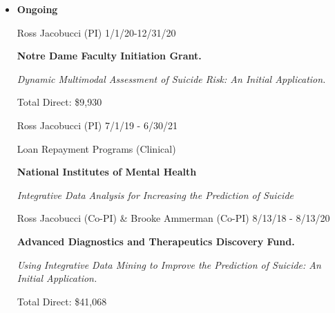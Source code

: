 \documentclass[letterpaper,10pt]{article}
\begin{document}
\begin{itemize} 
	\setlength{\topsep}{0pt}%
	\setlength{\leftmargin}{0.1in}%
	\setlength{\listparindent}{-0.1in}%
	\setlength{\itemindent}{-0.2in}%
	\setlength{\parsep}{\parskip}%
\begin{comment}		
	\item {\textbf{\large{Pending}}}


\begin{center}
	\parbox{6.5in}{{Ross Jacobucci (PI) }   \hspace{9cm} Under Review}
	\parbox{6.5in}{\textbf{IES Statistical and Research Methodology in Education: Early Career Grant} }
	\parbox{6.5in}{\textit{Extending Regularized Structural Equation Modeling for Big Data in Education Research}}
	\parbox{6.5in}{Total Direct: \$139,759}
\end{center}

\begin{center}
	\parbox{6.5in}{{Ross Jacobucci (Co-PI) \& Brooke Ammerman (Co-PI)}   \hspace{3.8cm} Under Review}
	\parbox{6.5in}{\textbf{NIH 1R03MH120488-01} }
	\parbox{6.5in}{\textit{The Implementation and Validation of Integrative Machine Learning for Predicting Suicide Outcomes}}
	\parbox{6.5in}{Total Direct: \$99,188}
\end{center}
\end{comment}	

	
	\item{\textbf{\large{Ongoing}}}
	
		\begin{center}
		\parbox{6.5in}{{Ross Jacobucci (PI)}   \hspace{9.2cm} 1/1/20-12/31/20}
		\parbox{6.5in}{\textbf{Notre Dame Faculty Initiation Grant.} }
		\parbox{6.5in}{\textit{Dynamic Multimodal Assessment of Suicide Risk: An Initial Application.}}
		\parbox{6.5in}{Total Direct: \$9,930}
	\end{center}
	
	\begin{center}
		\parbox{6.5in}{{Ross Jacobucci (PI) }   \hspace{9cm} 7/1/19 - 6/30/21}
		\parbox{6.5in}{Loan Repayment Programs (Clinical)}
		\parbox{6.5in}{\textbf{National Institutes of Mental Health} }
		\parbox{6.5in}{\textit{Integrative Data Analysis for Increasing the Prediction of Suicide}}
	\end{center}
	
	
	
	\begin{center}
		\parbox{6.5in}{{Ross Jacobucci (Co-PI) \& Brooke Ammerman (Co-PI)}   \hspace{3.8cm} 8/13/18 - 8/13/20}
		\parbox{6.5in}{\textbf{Advanced Diagnostics and Therapeutics Discovery Fund.} }
		\parbox{6.5in}{\textit{Using Integrative Data Mining to Improve the Prediction of Suicide: An Initial Application.}}
		\parbox{6.5in}{Total Direct: \$41,068}
	\end{center}


\end{itemize}
\end{document}
